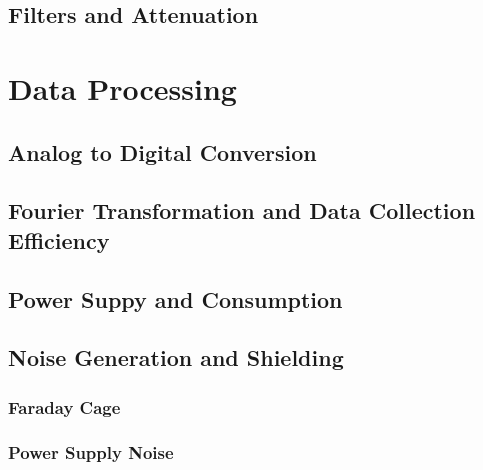 \subsection{Filters and Attenuation}

\section{Data Processing}

\subsection{Analog to Digital Conversion}

\subsection{Fourier Transformation and Data Collection Efficiency}

\subsection{Power Suppy and Consumption}

\subsection{Noise Generation and Shielding}

\subsubsection{Faraday Cage}

\subsubsection{Power Supply Noise}

